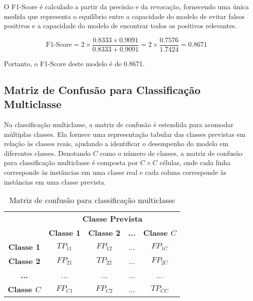 O F1-Score é calculado a partir da precisão e da revocação, fornecendo uma única medida que representa o equilíbrio entre a capacidade do modelo de evitar falsos positivos e a capacidade do modelo de encontrar todos os positivos relevantes.

\[
\text{F1-Score} = 2 \times \frac{0.8333 \times 0.9091}{0.8333 + 0.9091} = 2 \times \frac{0.7576}{1.7424} = 0.8671
\]

Portanto, o F1-Score deste modelo é de 0.8671.

\subsection{Matriz de Confusão para Classificação Multiclasse}

Na classificação multiclasse, a matriz de confusão é estendida para acomodar múltiplas classes. Ela fornece uma representação tabular das classes previstas em relação às classes reais, ajudando a identificar o desempenho do modelo em diferentes classes. Denotando \(C\) como o número de classes, a matriz de confusão para classificação multiclasse é composta por \(C \times C\) células, onde cada linha corresponde às instâncias em uma classe real e cada coluna corresponde às instâncias em uma classe prevista.

\begin{table}[h]
\centering
\caption{Matriz de confusão para classificação multiclasse}
\label{tab:confusion_matrix_multiclass}
\begin{tabular}{c|c|c|c|c}
\multicolumn{1}{c}{} & \multicolumn{4}{c}{\textbf{Classe Prevista}} \\ \cline{2-5} 
\multicolumn{1}{c|}{} & \textbf{Classe 1} & \textbf{Classe 2} & \textbf{...} & \textbf{Classe \(C\)} \\ \hline
 \rowcolor{red!25}  \textbf{Classe 1} & \cellcolor{green!25} \(TP_{11}\) & \(FP_{12}\) & ... & \(FP_{1C}\) \\ \hline
\rowcolor{red!25} \textbf{Classe 2} & \(FP_{21}\) & \cellcolor{green!25} \(TP_{22}\) & ... & \(FP_{2C}\) \\ \hline
\rowcolor{red!25} \textbf{...} & ... & ... & \cellcolor{green!25} ... & ... \\ \hline
\rowcolor{red!25} \textbf{Classe \(C\)} & \(FP_{C1}\) & \(FP_{C2}\) & ... & \cellcolor{green!25} \(TP_{CC}\) \\ \hline
\end{tabular}
\end{table}

